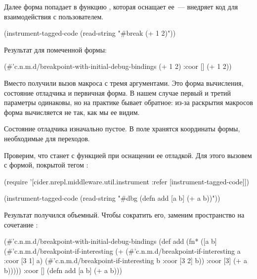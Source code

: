 Далее форма попадает в функцию , которая оснащает ее~--- внедряет код для взаимодействия с пользователем.

\begin{english}
  \begin{clojure}
(instrument-tagged-code
 (read-string "#break (+ 1 2)"))
  \end{clojure}
\end{english}

Результат для помеченной формы:

\begin{english}
  \begin{clojure}
(#'c.n.m.d/breakpoint-with-initial-debug-bindings
 (+ 1 2) {:coor []} (+ 1 2))
  \end{clojure}
\end{english}

Вместо  получили вызов макроса  с тремя аргументами. Это форма вычисления, состояние отладчика и первичная форма. В нашем случае первый и третий параметры одинаковы, но на практике бывает обратное: из-за раскрытия макросов форма вычисляется не так, как мы ее видим.

Состояние отладчика изначально пустое. В поле  хранятся координаты формы, необходимые для переходов.

Проверим, что станет с функцией при оснащении ее отладкой. Для этого вызовем  с формой, покрытой тегом :

\begin{english}
  \begin{clojure}
(require
 '[cider.nrepl.middleware.util.instrument
    :refer [instrument-tagged-code]])

(instrument-tagged-code
 (read-string "#dbg (defn add [a b] (+ a b))"))
  \end{clojure}
\end{english}

Результат получился объемный. Чтобы сократить его, заменим пространство  на сочетание :

\begin{english}
  \begin{clojure}
(#'c.n.m.d/breakpoint-with-initial-debug-bindings
 (def
  add
  (fn*
   ([a b]
    (#'c.n.m.d/breakpoint-if-interesting
     (+
      (#'c.n.m.d/breakpoint-if-interesting
       a {:coor [3 1]} a)
      (#'c.n.m.d/breakpoint-if-interesting
       b {:coor [3 2]} b))
     {:coor [3]}
     (+ a b)))))
 {:coor []}
 (defn add [a b] (+ a b)))
  \end{clojure}
\end{english}

